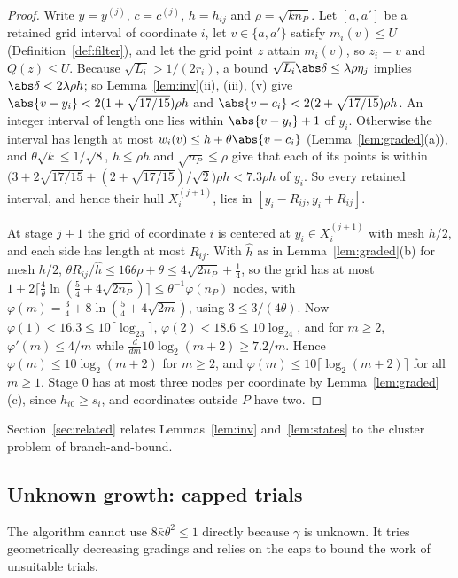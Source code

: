 \begin{proof}
Write $y=y^{(j)}$, $c=c^{(j)}$, $h=h_{ij}$ and $\rho=\sqrt{kn_P}$. Let
$[a,a']$ be a retained grid interval of coordinate $i$, let
$v\in\{a,a'\}$ satisfy $m_i(v)\le U$ (Definition~\ref{def:filter}), and let
the grid point $z$ attain $m_i(v)$, so $z_i=v$ and $Q(z)\le U$. Because
$\sqrt{L_i}>1/(2r_i)$, a bound $\sqrt{L_i}\abs\delta\le\lambda\rho\eta_j$
implies $\abs\delta<2\lambda\rho h$; so Lemma~\ref{lem:inv}(ii), (iii), (v)
give $\abs{v-y_i}<2(1+\sqrt{17/15})\rho h$ and
$\abs{v-c_i}<2(2+\sqrt{17/15})\rho h$. An integer interval of length one
lies within $\abs{v-y_i}+1$ of $y_i$. Otherwise the interval has length at
most $w_i(v)\le h+\theta\abs{v-c_i}$ (Lemma~\ref{lem:graded}(a)), and
$\theta\sqrt k\le1/\sqrt8$, $h\le\rho h$ and $\sqrt{n_P}\le\rho$ give that
each of its points is within
$\bigl(3+2\sqrt{17/15}+(2+\sqrt{17/15})/\sqrt2\bigr)\rho h<7.3\rho h$ of
$y_i$. So every retained interval, and hence their hull $X_i^{(j+1)}$, lies
in $[y_i-R_{ij},y_i+R_{ij}]$.

At stage $j+1$ the grid of coordinate $i$ is centered at
$y_i\in X_i^{(j+1)}$ with mesh $h/2$, and each side has length at most
$R_{ij}$. With $\hat h$ as in Lemma~\ref{lem:graded}(b) for mesh $h/2$,
$\theta R_{ij}/\hat h\le16\theta\rho+\theta\le4\sqrt{2n_P}+\frac14$, so the
grid has at most $1+2\lceil\frac4\theta\ln(\frac54+4\sqrt{2n_P})\rceil
\le\theta^{-1}\varphi(n_P)$ nodes, with
$\varphi(m)=\frac34+8\ln(\frac54+4\sqrt{2m})$, using $3\le3/(4\theta)$. Now
$\varphi(1)<16.3\le10\lceil\log_23\rceil$, $\varphi(2)<18.6\le10\log_24$, and
for $m\ge2$, $\varphi'(m)\le4/m$ while
$\frac{d}{dm}10\log_2(m+2)\ge7.2/m$. Hence $\varphi(m)\le10\log_2(m+2)$ for
$m\ge2$, and $\varphi(m)\le10\lceil\log_2(m+2)\rceil$ for all $m\ge1$. Stage
$0$ has at most three nodes per coordinate by Lemma~\ref{lem:graded}(c),
since $h_{i0}\ge s_i$, and coordinates outside $P$ have two.
\end{proof}

Section~\ref{sec:related} relates Lemmas~\ref{lem:inv} and~\ref{lem:states}
to the cluster problem of branch-and-bound.


\subsection{Unknown growth: capped trials}
The algorithm cannot use $8\bar\kappa\theta^2\le1$ directly because $\gamma$
is unknown. It tries geometrically decreasing gradings and relies on the caps
to bound the work of unsuitable trials.

